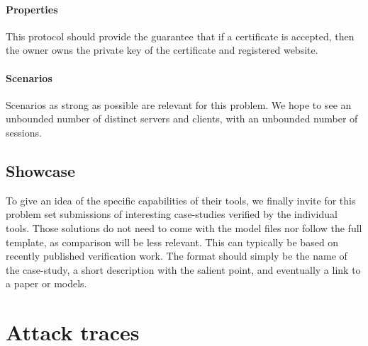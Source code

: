 \documentclass[11pt]{article}
\begin{document}
\paragraph{Properties} This protocol should provide the guarantee that if a certificate is accepted, then the owner owns the private key of the certificate and registered website.

\paragraph{Scenarios} Scenarios as strong as possible are relevant for this problem. We hope to see an unbounded number of distinct servers and clients, with an unbounded number of sessions. 

\subsection{Showcase}\label{prob:showcase}

To give an idea of the specific capabilities of their tools, we finally invite for this problem set submissions of interesting case-studies verified by the individual tools. Those solutions do not need to come with the model files nor follow the full template, as comparison will be less relevant. This can typically be based on recently published verification work. The format should simply be the name of the case-study, a short description with the salient point, and eventually a link to a paper or models.

\appendix

\section{Attack traces}\label{app:attacks}
\end{document}
